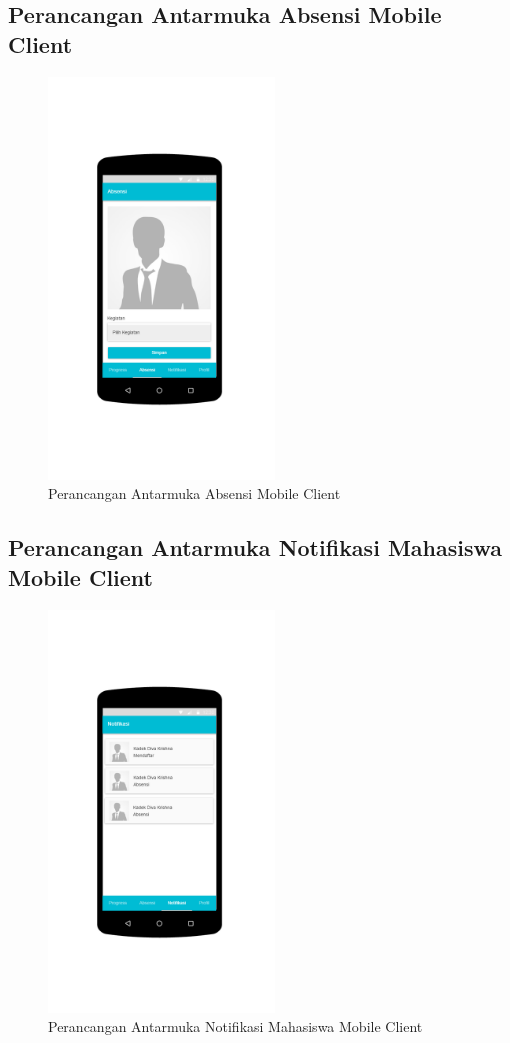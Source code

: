 \subsection{Perancangan Antarmuka Absensi Mobile Client }
	\begin{figure}[H]
		\includegraphics[width=6cm]{figures/diagram/image124.png}
		\centering
		\caption{Perancangan Antarmuka Absensi Mobile Client}
	\end{figure}
\subsection{Perancangan Antarmuka Notifikasi Mahasiswa  Mobile Client }
	\begin{figure}[H]
		\includegraphics[width=6cm]{figures/diagram/image125.png}
		\centering
		\caption{Perancangan Antarmuka Notifikasi Mahasiswa  Mobile Client}
	\end{figure}
